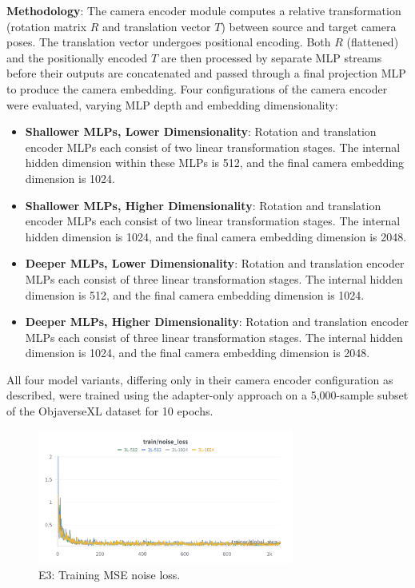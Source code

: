 \textbf{Methodology}:
The camera encoder module computes a relative transformation (rotation matrix $R$ and translation vector $T$) between source and target camera poses. The translation vector undergoes positional encoding. Both $R$ (flattened) and the positionally encoded $T$ are then processed by separate MLP streams before their outputs are concatenated and passed through a final projection MLP to produce the camera embedding.
Four configurations of the camera encoder were evaluated, varying MLP depth and embedding dimensionality:
\begin{itemize}
  \item \textbf{Shallower MLPs, Lower Dimensionality}: Rotation and translation encoder MLPs each consist of two linear transformation stages. The internal hidden dimension within these MLPs is 512, and the final camera embedding dimension is 1024.
  \item \textbf{Shallower MLPs, Higher Dimensionality}: Rotation and translation encoder MLPs each consist of two linear transformation stages. The internal hidden dimension is 1024, and the final camera embedding dimension is 2048.
  \item \textbf{Deeper MLPs, Lower Dimensionality}: Rotation and translation encoder MLPs each consist of three linear transformation stages. The internal hidden dimension is 512, and the final camera embedding dimension is 1024.
  \item \textbf{Deeper MLPs, Higher Dimensionality}: Rotation and translation encoder MLPs each consist of three linear transformation stages. The internal hidden dimension is 1024, and the final camera embedding dimension is 2048.
\end{itemize}
All four model variants, differing only in their camera encoder configuration as described, were trained using the adapter-only approach on a 5,000-sample subset of the ObjaverseXL dataset for 10 epochs.

\begin{figure}[htbp]
  \centering
  \includegraphics[width=0.75\textwidth]{images/experiments/cam_depth/train.png}
  \caption{E3: Training MSE noise loss.}
  \label{fig:exp_cam_depth_train_loss}
\end{figure}

